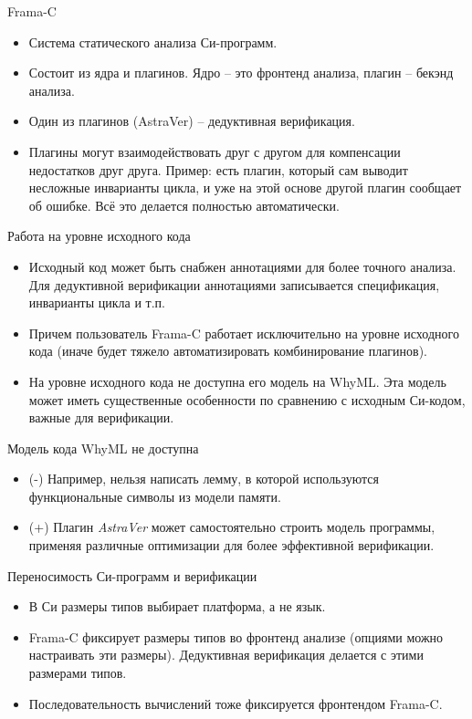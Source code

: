 \documentclass[hyperref={unicode=true}]{beamer}
\begin{document}
    \begin{frame}{Frama-C}
    \begin{itemize}
    \item Система статического анализа Си-программ.
    \item Состоит из ядра и плагинов. Ядро -- это фронтенд
    анализа, плагин -- бекэнд анализа.
    \item Один из плагинов (AstraVer) -- дедуктивная верификация.
    \item Плагины могут взаимодействовать друг с другом
    для компенсации недостатков друг друга. Пример:
    есть плагин, который сам выводит несложные инварианты цикла,
    и уже на этой основе другой плагин сообщает об ошибке.
    Всё это делается полностью автоматически.
    \end{itemize}
    \end{frame}

    \begin{frame}{Работа на уровне исходного кода}
    \begin{itemize}
    \item Исходный код может быть снабжен аннотациями
    для более точного анализа. Для дедуктивной верификации
    аннотациями записывается спецификация, инварианты цикла
    и т.п.
    \item Причем пользователь Frama-C работает
    исключительно на уровне исходного кода (иначе будет тяжело
    автоматизировать комбинирование плагинов).
    \item На уровне исходного кода не доступна его модель на WhyML.
    Эта модель может иметь существенные особенности по сравнению
    с исходным Си-кодом, важные для верификации.
    \end{itemize}
    \end{frame}

    \begin{frame}{Модель кода WhyML не доступна}
    \begin{itemize}
    \item (-) Например, нельзя написать лемму, в которой
    используются функциональные символы из модели памяти.
    \item (+) Плагин \textsl{AstraVer} может самостоятельно
    строить модель программы, применяя различные
    оптимизации для более эффективной верификации.
    \end{itemize}
    \end{frame}

    \begin{frame}{Переносимость Си-программ и верификации}
    \begin{itemize}
    \item
    В Си размеры типов выбирает платформа, а не язык.
    \item
    Frama-C фиксирует размеры типов во фронтенд анализе
    (опциями можно настраивать эти размеры). Дедуктивная
    верификация делается с этими размерами типов.
    \item
    Последовательность вычислений тоже фиксируется
    фронтендом Frama-C.
    \end{itemize}
    \end{frame}
\end{document}
